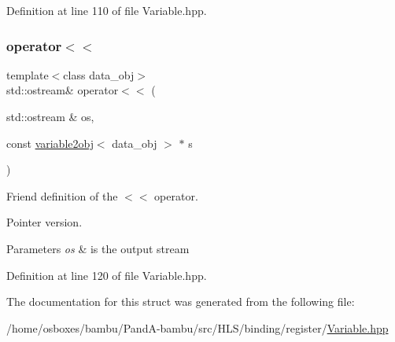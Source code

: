 Definition at line 110 of file Variable.\+hpp.

\mbox{\label{structvariable2obj_ac8f9096ea38db98770e9e523552233fb}} 
\subsubsection{\texorpdfstring{operator$<$$<$}{operator<<}\hspace{0.1cm}{\footnotesize\ttfamily [2/2]}}
{\footnotesize\ttfamily template$<$class data\+\_\+obj$>$ \\
std\+::ostream\& operator$<$$<$ (\begin{DoxyParamCaption}\item[{std\+::ostream \&}]{os,  }\item[{const \hyperlink{structvariable2obj}{variable2obj}$<$ data\+\_\+obj $>$ $\ast$}]{s }\end{DoxyParamCaption})\hspace{0.3cm}{\ttfamily [friend]}}



Friend definition of the $<$$<$ operator. 

Pointer version. 
\begin{DoxyParams}{Parameters}
{\em os} & is the output stream \\
\hline
\end{DoxyParams}


Definition at line 120 of file Variable.\+hpp.



The documentation for this struct was generated from the following file\+:\begin{DoxyCompactItemize}
\item 
/home/osboxes/bambu/\+Pand\+A-\/bambu/src/\+H\+L\+S/binding/register/\hyperlink{Variable_8hpp}{Variable.\+hpp}\end{DoxyCompactItemize}

